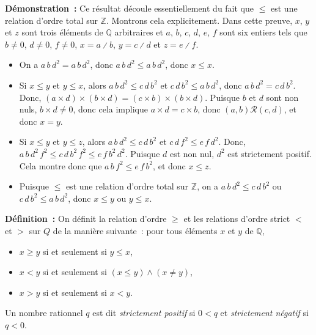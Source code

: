 \noindent\textbf{Démonstration :} Ce résultat découle essentiellement du fait que $\leq$ est une relation d'ordre total sur $\mathbb{Z}$.
    Montrons cela explicitement.
    Dans cette preuve, $x$, $y$ et $z$ sont trois éléments de $\mathbb{Q}$ arbitraires et $a$, $b$, $c$, $d$, $e$, $f$ sont six entiers tels que $b \neq 0$, $d \neq 0$, $f \neq 0$, $x = a \divslash b$, $y = c \divslash d$ et $z = e \divslash f$.
    \begin{itemize}[nosep]
        \item On a $a \, b \, d^2 = a \, b \, d^2$, donc $a \, b \, d^2 \leq a \, b \, d^2$, donc $x \leq x$.
        \item Si $x \leq y$ et $y \leq x$, alors $a \, b \, d^2 \leq c \, d \, b^2$ et $c \, d \, b^2 \leq a \, b \, d^2$, donc $a \, b \, d^2 = c \, d \, b^2$.
            Donc, $(a \times d) \times (b \times d) = (c \times b) \times (b \times d)$.
            Puisque $b$ et $d$ sont non nuls, $b \times d \neq 0$, donc cela implique $a \times d = c \times b$, donc $(a, b) \mathrel{\mathcal{R}} (c, d)$, et donc $x = y$.
        \item Si $x \leq y$ et $y \leq z$, alors $a \, b \, d^2 \leq c \, d \, b^2$ et $c \, d \, f^2 \leq e \, f \, d^2$.
            Donc, $a \, b \, d^2 \, f^2 \leq c \, d \, b^2 \, f^2 \leq e \, f \, b^2 \, d^2$.
            Puisque $d$ est non nul, $d^2$ est strictement positif.
            Cela montre donc que $a \, b \, f^2 \leq e \, f \, b^2$, et donc $x \leq z$.
        \item Puisque $\leq$ est une relation d'ordre total sur $\mathbb{Z}$, on a $a \, b \, d^2 \leq c \, d \, b^2$ ou $c \, d \, b^2 \leq a \, b \, d^2$, donc $x \leq y$ ou $y \leq x$.
    \end{itemize}

    \done

\medskip

\noindent\textbf{Définition :} On définit la relation d'ordre $\geq$ et les relations d'ordre strict $<$ et $>$ sur $Q$ de la manière suivante : pour tous éléments $x$ et $y$ de $\mathbb{Q}$, 
\begin{itemize}[nosep]
    \item $x \geq y$ si et seulement si $y \leq x$,
    \item $x < y$ si et seulement si $(x \leq y) \wedge (x \neq y)$,
    \item $x > y$ si et seulement si $x < y$.
\end{itemize}
Un nombre rationnel $q$ est dit \emph{strictement positif} si $0 < q$ et \emph{strictement négatif} si $q < 0$.

